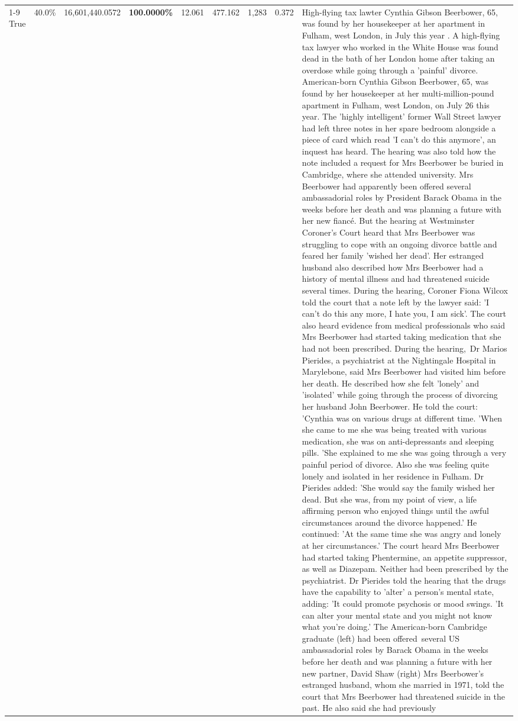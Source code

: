 \begin{table}[H]
\begin{tabular}{lllrlllll}
\cline{1-9}
True & 40.0\% & 16,601,440.0572 & \bfseries \color{red} 100.0000\% & 12.061 & 477.162 & 1,283 & 0.372 & High-flying tax lawter Cynthia Gibson Beerbower, 65, was found by her housekeeper at her apartment in Fulham, west London, in July this year . A high-flying tax lawyer who worked in the White House was found dead in the bath of her London home after taking an overdose while going through a 'painful' divorce. American-born Cynthia Gibson Beerbower, 65, was found by her housekeeper at her multi-million-pound apartment in Fulham, west London, on July 26 this year. The 'highly intelligent' former Wall Street lawyer had left three notes in her spare bedroom alongside a piece of card which read 'I can't do this anymore', an inquest has heard. The hearing was also told how the note included a request for Mrs Beerbower be buried in Cambridge, where she attended university. Mrs Beerbower had apparently been offered several ambassadorial roles by President Barack Obama in the weeks before her death and was planning a future with her new fiancé. But the hearing at Westminster Coroner's Court heard that Mrs Beerbower was struggling to cope with an ongoing divorce battle and feared her family 'wished her dead'. Her estranged husband also described how Mrs Beerbower had a history of mental illness and had threatened suicide several times. During the hearing, Coroner Fiona Wilcox told the court that a note left by the lawyer said: 'I can't do this any more, I hate you, I am sick'. The court also heard evidence from medical professionals who said Mrs Beerbower had started taking medication that she had not been prescribed. During the hearing, Dr Marios Pierides, a psychiatrist at the Nightingale Hospital in Marylebone, said Mrs Beerbower had visited him before her death. He described how she felt 'lonely' and 'isolated' while going through the process of divorcing her husband John Beerbower. He told the court: 'Cynthia was on various drugs at different time. 'When she came to me she was being treated with various medication, she was on anti-depressants and sleeping pills. 'She explained to me she was going through a very painful period of divorce. Also she was feeling quite lonely and isolated in her residence in Fulham. Dr Pierides added: 'She would say the family wished her dead. But she was, from my point of view, a life affirming person who enjoyed things until the awful circumstances around the divorce happened.' He continued: 'At the same time she was angry and lonely at her circumstances.' The court heard Mrs Beerbower had started taking Phentermine, an appetite suppressor, as well as Diazepam. Neither had been prescribed by the psychiatrist. Dr Pierides told the hearing that the drugs have the capability to 'alter' a person's mental state, adding: 'It could promote psychosis or mood swings. 'It can alter your mental state and you might not know what you're doing.' The American-born Cambridge graduate (left) had been offered several US ambassadorial roles by Barack Obama in the weeks before her death and was planning a future with her new partner, David Shaw (right) Mrs Beerbower's estranged husband, whom she married in 1971, told the court that Mrs Beerbower had threatened suicide in the past. He also said she had previously 
\end{tabular}
\end{table}
